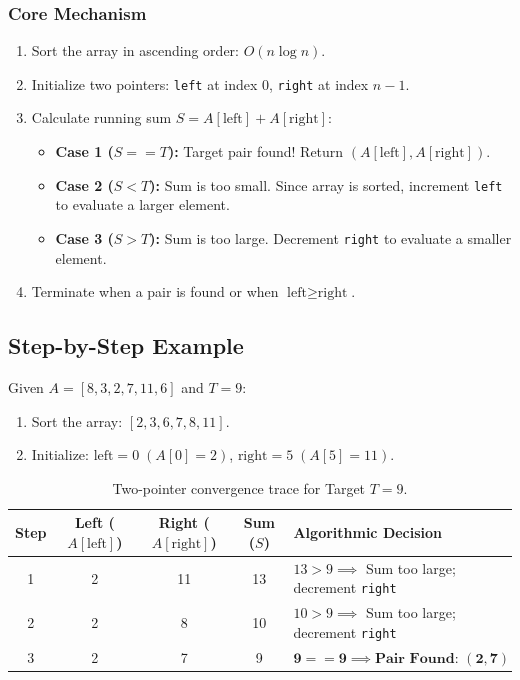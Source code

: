\subsubsection*{Core Mechanism}
\begin{enumerate}
    \item Sort the array in ascending order: $O(n \log n)$.
    \item Initialize two pointers: \texttt{left} at index $0$, \texttt{right} at index $n - 1$.
    \item Calculate running sum $S = A[\text{left}] + A[\text{right}]$:
    \begin{itemize}
        \item \textbf{Case 1 ($S == T$):} Target pair found! Return $(A[\text{left}], A[\text{right}])$.
        \item \textbf{Case 2 ($S < T$):} Sum is too small. Since array is sorted, increment \texttt{left} to evaluate a larger element.
        \item \textbf{Case 3 ($S > T$):} Sum is too large. Decrement \texttt{right} to evaluate a smaller element.
    \end{itemize}
    \item Terminate when a pair is found or when $\text{left} \geq \text{right}$.
\end{enumerate}

\subsection{Step-by-Step Example}
Given $A = [8, 3, 2, 7, 11, 6]$ and $T = 9$:
\begin{enumerate}
    \item Sort the array: $[2, 3, 6, 7, 8, 11]$.
    \item Initialize: $\text{left} = 0 \; (A[0] = 2)$, $\text{right} = 5 \; (A[5] = 11)$.
\end{enumerate}

\begin{table}[htbp]
\centering
\small
\begin{tabular}{c c c c l}
\toprule
\textbf{Step} & \textbf{Left ($A[\text{left}]$)} & \textbf{Right ($A[\text{right}]$)} & \textbf{Sum ($S$)} & \textbf{Algorithmic Decision} \\
\midrule
1 & 2 & 11 & 13 & $13 > 9 \implies$ Sum too large; decrement \texttt{right} \\
2 & 2 & 8  & 10 & $10 > 9 \implies$ Sum too large; decrement \texttt{right} \\
3 & 2 & 7  & 9  & $\mathbf{9 == 9 \implies \text{Pair Found: } (2, 7)}$ \\
\bottomrule
\end{tabular}
\caption{Two-pointer convergence trace for Target $T = 9$.}
\end{table}

